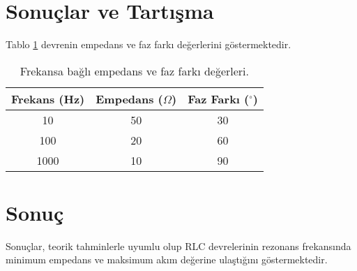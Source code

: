 \documentclass[11pt,letterpaper,twocolumn]{article}
\begin{document}
\section{Sonuçlar ve Tartışma}
\justify
Tablo \ref{tab:sonuclar} devrenin empedans ve faz farkı değerlerini göstermektedir.

\begin{table}[H]
    \centering
    \begin{tabular}{|c|c|c|}
    \hline
    Frekans (Hz) & Empedans (\(\Omega\)) & Faz Farkı (\(^\circ\)) \\ \hline
    10 & 50 & 30 \\ \hline
    100 & 20 & 60 \\ \hline
    1000 & 10 & 90 \\ \hline
    \end{tabular}
    \caption{Frekansa bağlı empedans ve faz farkı değerleri.}
    \label{tab:sonuclar}
\end{table}

\section{Sonuç}
\justify
Sonuçlar, teorik tahminlerle uyumlu olup RLC devrelerinin rezonans frekansında minimum empedans ve maksimum akım değerine ulaştığını göstermektedir.
\end{document}
